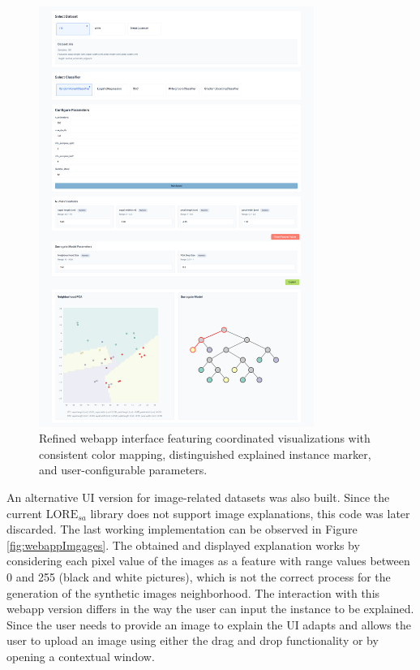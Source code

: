 \begin{figure}[htbp]
    \centering
    \includegraphics[width=0.8\textwidth]{images/webapp improved look overall.png}
    \caption{Refined webapp interface featuring coordinated visualizations with consistent color mapping, distinguished explained instance marker, and user-configurable parameters.}
    \label{fig:webappV2}
\end{figure}

An alternative UI version for image-related datasets was also built. Since the current $\text{LORE}_{sa}$ library does not support image explanations, this code was later discarded. The last working implementation \cite{git17commit} can be observed in Figure \ref{fig:webappImgages}. The obtained and displayed explanation works by considering each pixel value of the images as a feature with range values between 0 and 255 (black and white pictures), which is not the correct process for the generation of the synthetic images neighborhood.
The interaction with this webapp version differs in the way the user can input the instance to be explained. Since the user needs to provide an image to explain the UI adapts and allows the user to upload an image using either the drag and drop functionality or by opening a contextual window.

